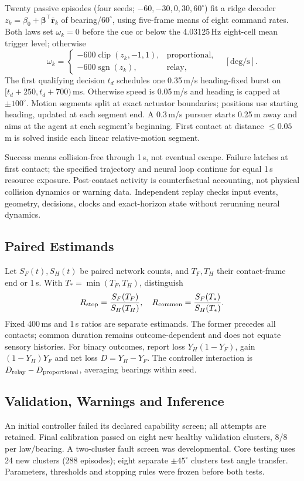Twenty passive episodes (four seeds; $-60,-30,0,30,60^\circ$) fit a ridge decoder $z_k=\beta_0+\boldsymbol\beta^\top\bar{\mathbf r}_k$ of bearing/$60^\circ$, using five-frame means of eight command rates. Both laws set $\omega_k=0$ before the cue or below the 4.03125\,Hz eight-cell mean trigger level; otherwise
\begin{equation}
\omega_k=\begin{cases}
-600\operatorname{clip}(z_k,-1,1),&\text{proportional},\\
-600\operatorname{sgn}(z_k),&\text{relay},
\end{cases}\quad[\mathrm{deg/s}].
\end{equation}
The first qualifying decision $t_d$ schedules one 0.35\,m/s heading-fixed burst on $[t_d+250,t_d+700)$\,ms. Otherwise speed is 0.05\,m/s and heading is capped at $\pm100^\circ$. Motion segments split at exact actuator boundaries; positions use starting heading, updated at each segment end. A 0.3\,m/s pursuer starts 0.25\,m away and aims at the agent at each segment's beginning. First contact at distance $\leq0.05$\,m is solved inside each linear relative-motion segment.

Success means collision-free through 1\,s, not eventual escape. Failure latches at first contact; the specified trajectory and neural loop continue for equal 1\,s resource exposure. Post-contact activity is counterfactual accounting, not physical collision dynamics or warning data. Independent replay checks input events, geometry, decisions, clocks and exact-horizon state without rerunning neural dynamics.

\subsection{Paired Estimands}
Let $S_F(t),S_H(t)$ be paired network counts, and $T_F,T_H$ their contact-frame end or 1\,s. With $T_*=\min(T_F,T_H)$, distinguish
\begin{equation}
R_{\rm stop}=\frac{S_F(T_F)}{S_H(T_H)},\quad
R_{\rm common}=\frac{S_F(T_*)}{S_H(T_*)}.
\end{equation}
Fixed 400\,ms and 1\,s ratios are separate estimands. The former precedes all contacts; common duration remains outcome-dependent and does not equate sensory histories. For binary outcomes, report loss $Y_H(1-Y_F)$, gain $(1-Y_H)Y_F$ and net loss $D=Y_H-Y_F$. The controller interaction is $D_{\rm relay}-D_{\rm proportional}$, averaging bearings within seed.

\subsection{Validation, Warnings and Inference}
An initial controller failed its declared capability screen; all attempts are retained. Final calibration passed on eight new healthy validation clusters, 8/8 per law/bearing. A two-cluster fault screen was developmental. Core testing uses 24 new clusters (288 episodes); eight separate $\pm45^\circ$ clusters test angle transfer. Parameters, thresholds and stopping rules were frozen before both tests.

